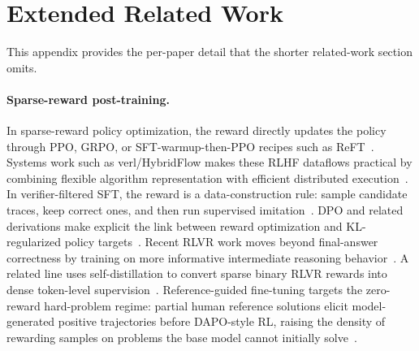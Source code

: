 \documentclass{article}
\begin{document}
\section{Extended Related Work}
\label{app:extended-related}

This appendix provides the per-paper detail that the shorter related-work section omits.

\paragraph{Sparse-reward post-training.} In sparse-reward policy optimization, the reward directly updates the policy through PPO, GRPO, or SFT-warmup-then-PPO recipes such as ReFT~\citep{schulman2017proximal,shao2024deepseekmath,luong2024reft}. Systems work such as verl/HybridFlow makes these RLHF dataflows practical by combining flexible algorithm representation with efficient distributed execution~\citep{sheng2024hybridflow}. In verifier-filtered SFT, the reward is a data-construction rule: sample candidate traces, keep correct ones, and then run supervised imitation~\citep{zelikman2022star,singh2024beyond,yang2024qwen25math}. DPO and related derivations make explicit the link between reward optimization and KL-regularized policy targets~\citep{rafailov2024direct}. Recent RLVR work moves beyond final-answer correctness by training on more informative intermediate reasoning behavior~\citep{lee2026beyondcorrectness}. A related line uses self-distillation to convert sparse binary RLVR rewards into dense token-level supervision~\citep{he2026sdzero,yang2026rlsd}. Reference-guided fine-tuning targets the zero-reward hard-problem regime: partial human reference solutions elicit model-generated positive trajectories before DAPO-style RL, raising the density of rewarding samples on problems the base model cannot initially solve~\citep{wu2026regft}.
\end{document}
